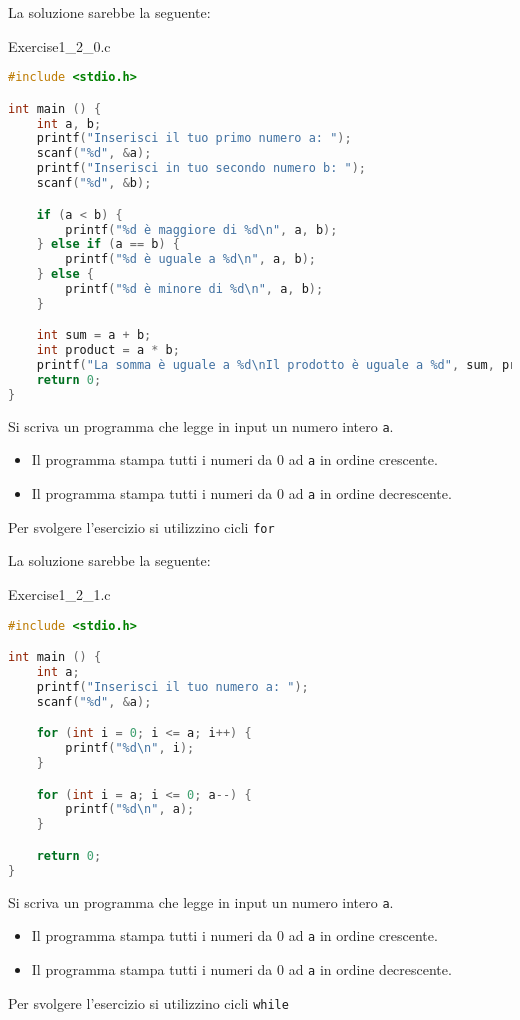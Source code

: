 La soluzione sarebbe la seguente:

\begin{codeblock}{Exercise1\_2\_0.c}
    \begin{lstlisting}[language = c]
#include <stdio.h>

int main () {
    int a, b;
    printf("Inserisci il tuo primo numero a: ");
    scanf("%d", &a);
    printf("Inserisci in tuo secondo numero b: ");
    scanf("%d", &b);

    if (a < b) {
        printf("%d è maggiore di %d\n", a, b);
    } else if (a == b) {
        printf("%d è uguale a %d\n", a, b);
    } else {
        printf("%d è minore di %d\n", a, b);
    }

    int sum = a + b;
    int product = a * b;
    printf("La somma è uguale a %d\nIl prodotto è uguale a %d", sum, product);
    return 0;
}\end{lstlisting}
\end{codeblock}

\begin{exercise}
    Si scriva un programma che legge in input un numero intero \verb|a|.
    \begin{itemize}
        \item [1)] Il programma stampa tutti i numeri da 0 ad \verb|a| in ordine crescente.
        \item [2)] Il programma stampa tutti i numeri da 0 ad \verb|a| in ordine decrescente.
    \end{itemize}
    Per svolgere l'esercizio si utilizzino cicli \verb|for|
\end{exercise}

La soluzione sarebbe la seguente:

\begin{codeblock}{Exercise1\_2\_1.c}
    \begin{lstlisting}[language = c]
#include <stdio.h>

int main () {
    int a;
    printf("Inserisci il tuo numero a: ");
    scanf("%d", &a);

    for (int i = 0; i <= a; i++) {
        printf("%d\n", i);
    }

    for (int i = a; i <= 0; a--) {
        printf("%d\n", a);
    }

    return 0;
}\end{lstlisting}
\end{codeblock}

\begin{exercise}
    Si scriva un programma che legge in input un numero intero \verb|a|.
    \begin{itemize}
        \item [1)] Il programma stampa tutti i numeri da 0 ad \verb|a| in ordine crescente.
        \item [2)] Il programma stampa tutti i numeri da 0 ad \verb|a| in ordine decrescente.
    \end{itemize}
    Per svolgere l'esercizio si utilizzino cicli \verb|while|
\end{exercise}

